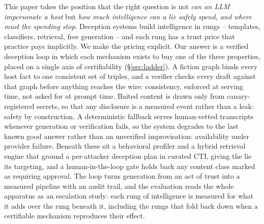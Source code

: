 This paper takes the position that the right question is not
\emph{can an LLM impersonate a host} but \emph{how much intelligence can
a lie safely spend, and where must the spending stop}. Deception systems
build intelligence in rungs -- templates, classifiers, retrieval, free
generation -- and each rung has a trust price that practice pays
implicitly. We make the pricing explicit. Our answer is a verified
deception loop in which
each mechanism exists to buy one of the three properties, placed on a
single axis of certifiability (\S\ref{sec:ladder}). A fiction graph
binds every host fact to one consistent set of triples, and a verifier
checks every draft against that graph before anything reaches the wire:
consistency, enforced at serving time, not asked for at prompt time.
Baited content is drawn only from canary-registered secrets, so that any
disclosure is a measured event rather than a leak: safety by
construction. A deterministic fallback serves human-vetted transcripts
whenever generation or verification fails, so the system degrades to the
last known good answer rather than an unverified improvisation:
availability under provider failure. Beneath these sit a behavioral
profiler and a hybrid retrieval engine that ground a per-attacker
deception plan in curated CTI, giving the lie its targeting, and a
human-in-the-loop gate holds back any content class marked as requiring
approval. The loop turns generation from an act of trust into a measured
pipeline with an audit trail, and the evaluation reads the whole
apparatus as an escalation study: each rung of intelligence is measured
for what it adds over the rung beneath it, including the rungs that fold
back down when a certifiable mechanism reproduces their effect.

